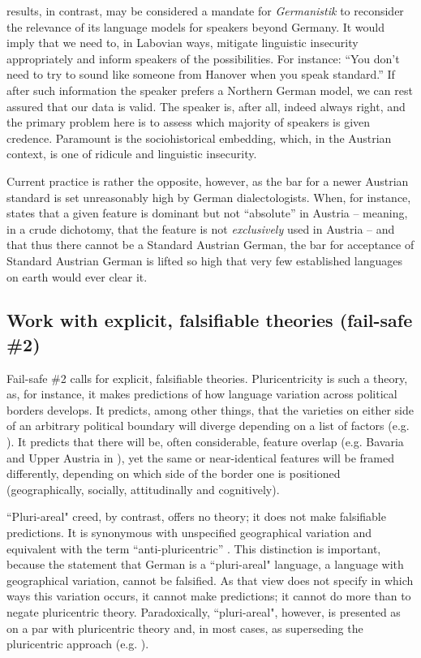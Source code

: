 \documentclass[output=paper]{langscibook}
\begin{document}
 results, in contrast, may be considered a mandate for \textit{Germanistik} to reconsider the relevance of its language models for speakers beyond Germany. It would imply that we need to, in Labovian ways, mitigate linguistic insecurity appropriately and inform speakers of the possibilities. For instance: “You don’t need to try to sound like someone from Hanover when you speak standard.” If after such information the speaker prefers a Northern German model, we can rest assured that our data is valid. The speaker is, after all, indeed always right, and the primary problem here is to assess which majority of speakers is given credence. Paramount is the sociohistorical embedding, which, in the Austrian context, is one of ridicule and linguistic insecurity.



Current practice is rather the opposite, however, as the bar for a newer Austrian standard is set unreasonably high by German dialectologists. When, for instance, \citet[66]{Elspaß2020} states that a given feature is dominant but not “absolute” in Austria – meaning, in a crude dichotomy, that the feature is not \textit{exclusively} used in Austria – and that thus there cannot be a Standard Austrian German, the bar for acceptance of Standard Austrian German is lifted so high that very few established languages on earth would ever clear it.


\subsection{Work with explicit, falsifiable theories (fail-safe \#2)}\label{sec:dollinger:4.2}

Fail-safe \#2 \citep[111--113]{Dollinger2019c} calls for explicit, falsifiable theories. Pluricentricity is such a theory, as, for instance, it makes predictions of how language variation across political borders develops. It predicts, among other things, that the varieties on either side of an arbitrary political boundary will diverge depending on a list of factors (e.g. \citealt[29]{Auer2005a}). It predicts that there will be, often considerable, feature overlap (e.g. Bavaria and Upper Austria in ), yet the same or near-identical features will be framed differently, depending on which side of the border one is positioned (geographically, socially, attitudinally and cognitively).

``Pluri-areal" creed, by contrast, offers no theory; it does not make falsifiable predictions. It is synonymous with unspecified geographical variation and equivalent with the term “anti-pluricentric” \parencites[103--106]{Dollinger2019b}[62--176]{Dollinger2019c}. This distinction is important, because the statement that German is a ``pluri-areal" language, a language with geographical variation, cannot be falsified. As that view does not specify in which ways this variation occurs, it cannot make predictions; it cannot do more than to negate pluricentric theory. Paradoxically, ``pluri-areal", however, is presented as on a par with pluricentric theory and, in most cases, as superseding the pluricentric approach (e.g. \citealt{DürscheidElspaß2015,ElspaßEtAl2017,Langer2021,DiÖ2021,MeerDurgasingh2025}).
\end{document}
